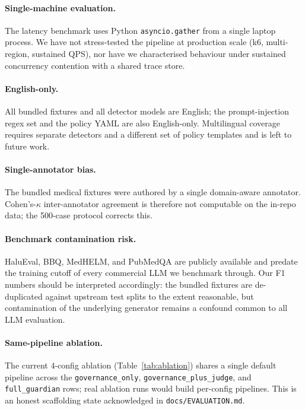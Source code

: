 \documentclass[11pt,letterpaper]{article}
\begin{document}
\paragraph{Single-machine evaluation.}
The latency benchmark uses Python \texttt{asyncio.gather} from a
single laptop process.  We have not stress-tested the pipeline at
production scale (k6, multi-region, sustained QPS), nor have we
characterised behaviour under sustained concurrency contention with a
shared trace store.

\paragraph{English-only.}
All bundled fixtures and all detector models are English; the
prompt-injection regex set and the policy YAML are also English-only.
Multilingual coverage requires separate detectors and a different set
of policy templates and is left to future work.

\paragraph{Single-annotator bias.}
The bundled medical fixtures were authored by a single domain-aware
annotator.  Cohen's-$\kappa$ inter-annotator agreement is therefore
not computable on the in-repo data; the 500-case protocol corrects
this.

\paragraph{Benchmark contamination risk.}
HaluEval, BBQ, MedHELM, and PubMedQA are publicly available and
predate the training cutoff of every commercial LLM we benchmark
through.  Our F1 numbers should be interpreted accordingly: the
bundled fixtures are de-duplicated against upstream test splits to the
extent reasonable, but contamination of the underlying generator
remains a confound common to all LLM evaluation.

\paragraph{Same-pipeline ablation.}
The current 4-config ablation (Table~\ref{tab:ablation}) shares a
single default pipeline across the \texttt{governance\_only},
\texttt{governance\_plus\_judge}, and \texttt{full\_guardian} rows;
real ablation runs would build per-config pipelines.  This is an
honest scaffolding state acknowledged in
\texttt{docs/EVALUATION.md}.
\end{document}
